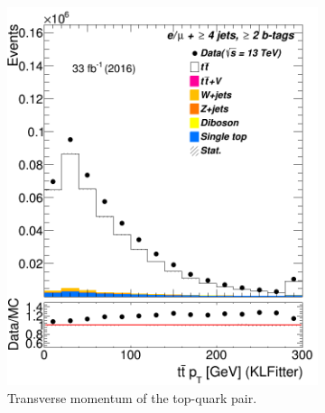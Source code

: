 \begin{figure}
\begin{subfigure}{0.35\textwidth}
		\includegraphics[width=\linewidth]{ControlPlots_emujets_2016_4incl_2incl/klf_ttbar_pt_emujets_2016.png}
		\caption{Transverse momentum of the top-quark pair.} \label{fig:33}
	\end{subfigure}
	\hspace*{1.5cm}	
	\begin{subfigure}{0.35\textwidth}

\end{subfigure}
\end{figure}
